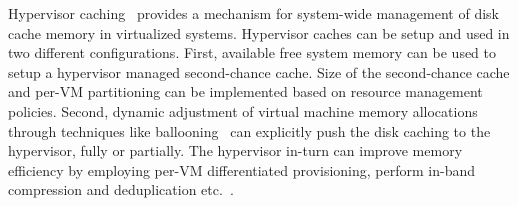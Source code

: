 %
%
Hypervisor caching~\cite{memtrans, oracletmem, kvmzcache, vmmexclusive, singleton} 
provides a mechanism for system-wide management of %
disk cache memory in virtualized systems. 
%
Hypervisor caches can be setup and used 
in two different configurations.
%
First, available free system memory can be used to setup a 
hypervisor managed second-chance cache.
%
Size of the second-chance cache and per-VM partitioning 
can be implemented based on resource management policies.
%
Second, dynamic adjustment of virtual machine memory allocations through
techniques like ballooning~\cite{vmware,hotplug} can explicitly
push the disk caching to the hypervisor, fully or partially.
%
%
The hypervisor in-turn can improve
memory efficiency by employing per-VM differentiated provisioning,
perform in-band compression and deduplication etc.~\cite{oracletmem,kvmzcache}.
%

